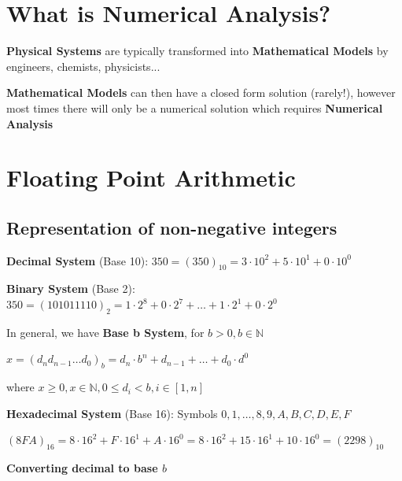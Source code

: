 \documentclass{article}
\begin{document}
\vspace{0.5cm}
\chead{}
\rhead{\leftmark}
\cfoot{}

\text{}

\section{What is Numerical Analysis?}

\textbf{Physical Systems} are typically transformed into \textbf{Mathematical Models} by engineers, chemists, physicists... 

\textbf{Mathematical Models} can then have a closed form solution (rarely!), however most times there will only be a numerical solution which requires \textbf{Numerical Analysis}

\section{Floating Point Arithmetic}

\subsection{Representation of non-negative integers}

\textbf{Decimal System} (Base 10): $350 = (350)_{10} = 3 \cdot 10^2 + 5 \cdot 10^1 + 0 \cdot 10^0$ 

\textbf{Binary System} (Base 2): $350 = (1 0 1 0 1 1 1 1 0)_{2} = 1 \cdot 2^8 + 0 \cdot 2^7 + \dots + 1 \cdot 2^1 + 0 \cdot 2^0$

\vspace{0.2cm}

In general, we have \textbf{Base b System}, for $b > 0, b \in \mathbb N$ 

$x = (d_n d_{n - 1} \dots d_0)_b = d_n \cdot b^n + d_{n - 1} + \dots + d_0 \cdot d^0$

where $x \geq 0, x \in \mathbb N, 0 \leq d_i < b, i \in [1,n]$

\vspace{0.2cm}

\textbf{Hexadecimal System} (Base 16): Symbols $0, 1, \dots , 8, 9, A, B, C, D, E, F$

$(8FA)_{16} = 8 \cdot 16^2 + F \cdot 16^1 + A \cdot 16^0 = 8 \cdot 16^2 + 15 \cdot 16^1 + 10 \cdot 16^0 = (2298)_{10}$

\vspace{0.2cm}

\textbf{Converting decimal to base $b$}
\end{document}
